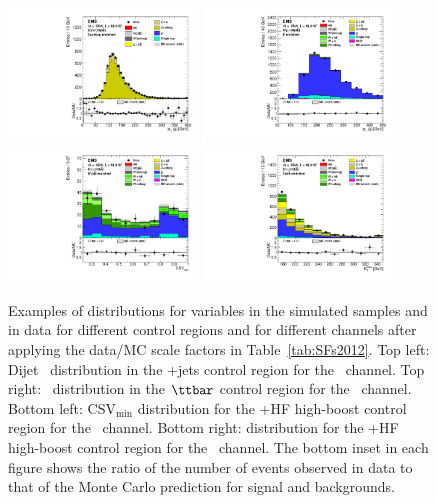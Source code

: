 \documentclass[11pt,twoside,a4paper,cmspaper,final,collab]{cms-tdr}
\begin{document}
\begin{figure}[tbh]
 \begin{center}
    \includegraphics[width=0.45\textwidth]{ZeeH_higgsCuts_Data_bbPt_Zlight_pTjj_Zee}
    \includegraphics[width=0.45\textwidth]{Wmnu-TTbar-ptjj-lin.pdf}
    \includegraphics[width=0.45\textwidth]{ZnunuHighPt_WjHF_CSVmin}
    \includegraphics[width=0.45\textwidth]{ZnunuHighPt_ZjHF_pfMET}
    \caption{Examples of distributions for variables in the simulated
      samples and in data for different
      control regions and for different channels after applying the
      data/MC scale factors in Table~\ref{tab:SFs2012}. Top left:
      Dijet \pt\ distribution in the
      \cPZ+jets control region for the \ZeeH\ channel. Top
        right: \pt\ distribution in the  $\ttbar$ control region for
      the \WmnH\ channel. Bottom left:  CSV$_{\text{min}}$
      distribution for the \PW+HF high-boost control region for the \ZnnH\
      channel. Bottom right: \MET distribution for the \cPZ+HF
      high-boost control region for the \ZnnH\ channel. The bottom inset in each
      figure shows the ratio of the number of events observed in data to that
      of the Monte Carlo prediction for signal and backgrounds.
    }
    \label{fig:control_regions_ex}
  \end{center}
\end{figure}
\end{document}
